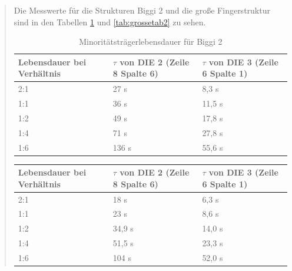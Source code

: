 \begin{quote}
	\vspace{2em}
	
	Die Messwerte für die Strukturen Biggi 2 und die große Fingerstruktur sind
	in den Tabellen \ref{tab:grossetab1} und \ref{tab:grossetab2} zu sehen.\\
	
	 \vspace{2em}

      		\begin{table}[H]
     		  \begin{addmargin}[-0.5cm]{3cm}
     			\centering
                   \begin{tabular}{|p{5cm}|p{5cm}|p{5cm}|}
         			\hline
         			Lebensdauer bei Verhältnis &  $\tau$ von DIE 2 (Zeile 8 Spalte 6) & $\tau$ von DIE 3 (Zeile 6 Spalte 1)\\
         			\hline
        			2:1 & 27 \micro s &  8,3 \micro s\\
        			\hline
        			1:1 & 36 \micro s &  11,5 \micro s\\
        			\hline
        			1:2 & 49 \micro s &  17,8 \micro s\\
        			\hline
        			1:4 & 71 \micro s &  27,8 \micro s\\
        			\hline
        			1:6 & 136 \micro s & 55,6 \micro s\\
        			\hline

                    \end{tabular}
              \end{addmargin}
              \caption{Minoritätsträgerlebensdauer für Biggi 2}
              \label{tab:grossetab1}
            \end{table}

     \vspace{2em}

      		\begin{table}[H]
     		  \begin{addmargin}[-0.5cm]{3cm}
     			\centering
                   \begin{tabular}{|p{5cm}|p{5cm}|p{5cm}|}
         			\hline
         			Lebensdauer bei Verhältnis &  $\tau$ von DIE 2 (Zeile 8 Spalte 6) & $\tau$ von DIE 3 (Zeile 6 Spalte 1)\\
         			\hline
        			2:1 & 18 \micro s &  6,3 \micro s\\
        			\hline
        			1:1 & 23 \micro s &  8,6  \micro s\\
        			\hline
        			1:2 & 34,9 \micro s &  14,0 \micro s\\
        			\hline
        			1:4 & 51,5 \micro s &  23,3 \micro s\\
        			\hline
        			1:6 & 104 \micro s & 52,0 \micro s\\
        			\hline


\end{tabular}
\end{addmargin}
\end{table}
\end{quote}
